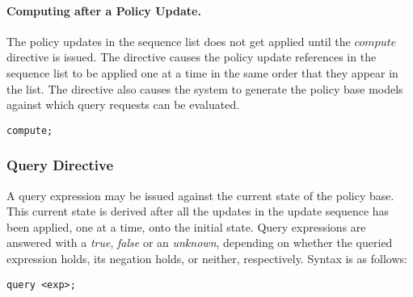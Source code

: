 \documentclass[10pt, twocolumn]{article}
\begin{document}
        \paragraph{Computing after a Policy Update.}

          The policy updates in the sequence list does not get applied until
          the $compute$ directive is issued. The directive causes the policy
          update references in the sequence list to be applied one at a time in
          the same order that they appear in the list. The directive also
          causes the system to generate the policy base models against which
          query requests can be evaluated.

          \begin{verbatim}compute;\end{verbatim}

      \subsubsection{Query Directive}

        A query expression may be issued against the current state of the
        policy base. This current state is derived after all the updates in
        the update sequence has been applied, one at a time, onto the initial
        state. Query expressions are answered with a \emph{true}, \emph{false}
        or an \emph{unknown}, depending on whether the queried expression
        holds, its negation holds, or neither, respectively. Syntax is as
        follows:

        \begin{verbatim}query <exp>;\end{verbatim} 
\end{document}
